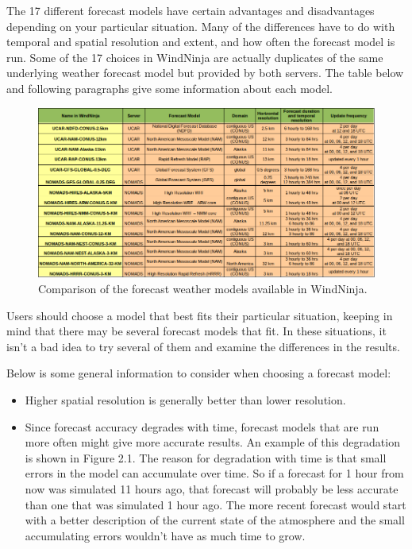 \documentclass[12pt]{article}
\begin{document}
The 17 different forecast models have certain advantages and disadvantages depending on your particular situation.  Many of the differences have to do with temporal and spatial resolution and extent, and how often the forecast model is run.  Some of the 17 choices in WindNinja are actually duplicates of the same underlying weather forecast model but provided by both servers.  The table below and following paragraphs give some information about each model.
\begin{landscape}
\begin{figure}[H]
	\centering
	\label{wx_model}
	\includegraphics[scale=1.0]{wx_table}
	\caption*{Comparison of the forecast weather models available in WindNinja.}
\end{figure}
\end{landscape}

Users should choose a model that best fits their particular situation, keeping in mind that there may be several forecast models that fit.  In these situations, it isn't a bad idea to try several of them and examine the differences in the results.


Below is some general information to consider when choosing a forecast model:
\begin{itemize}
\item Higher spatial resolution is generally better than lower resolution.
\item Since forecast accuracy degrades with time, forecast models that are run more often might give more accurate results.  An example of this degradation is shown in Figure 2.1.  The reason for degradation with time is that small errors in the model can accumulate over time.  So if a forecast for 1 hour from now was simulated 11 hours ago, that forecast will probably be less accurate than one that was simulated 1 hour ago.  The more recent forecast would start with a better description of the current state of the atmosphere and the small accumulating errors wouldn't have as much time to grow.
\end{itemize}
\end{document}
